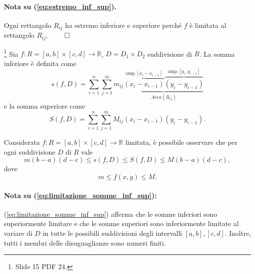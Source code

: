 \paragraph{Nota su (\ref{eq:estremo_inf_sup}).} Ogni rettangolo $R_{ij}$ ha estremo inferiore e superiore perché $f$ è limitata al rettangolo $R_{ij}$. $\qed$

\begin{definition}\footnote{Slide 15 PDF 24.}
	Sia $f:R = [a,b]\times[c,d]\rightarrow\mathbb{R}$, $D = D_1\times D_2$ suddivisione di $R$. La somma inferiore è definita come
	\begin{equation*}
		s(f,D) = \sum_{i=1}^{n}\sum_{j=1}^{m} m_{ij} \underbrace{\overbrace{(x_i-x_{i-1})}^{\text{amp.}[x_i-x_{i-1}]} \overbrace{(y_i-y_{i-1})}^{\text{amp.}[y_i,y_{i-1}]}}_{Area(R_{ij})}
	\end{equation*}
	e la somma superiore come
	\begin{equation*}
		S(f,D) = \sum_{i=1}^{n}\sum_{j=1}^{m} M_{ij} (x_i-x_{i-1})(y_i-y_{i-1}).
	\end{equation*}
\end{definition}


\begin{remark}
	Considerata $f:R = [a,b]\times[c,d]\rightarrow\mathbb{R}$ limitata, è possibile osservare che per ogni suddivisione $D$ di $R$ vale
	\begin{equation}\label{eq:limitazione_somme_inf_sup}
		m(b-a)(d-c) \leq s(f, D) \leq S(f, D) \leq M(b-a) (d-c),
	\end{equation}
	dove
	\begin{equation*}
		m\leq f(x,y) \leq M.
	\end{equation*}
\end{remark}

\paragraph{Nota su (\ref{eq:limitazione_somme_inf_sup}):} (\ref{eq:limitazione_somme_inf_sup}) afferma che le somme inferiori sono superiormente limitare e che le somme superiori sono inferiormente limitate al variare di $D$ in tutte le possibili suddivisioni degli intervalli $[a,b], [c,d]$. Inoltre, tutti i membri delle disuguaglianze sono numeri finiti.

